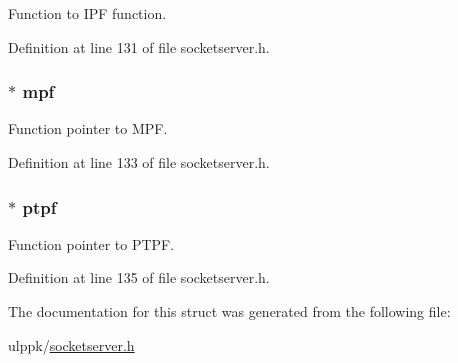 Function to I\-P\-F function. 



Definition at line 131 of file socketserver.\-h.

\hypertarget{struct_s_s_r_v_r___h_a_n_d_l_e_a2f352051a7414981c048ef9ac094a4f0}{
\subsubsection[{mpf}]{$\ast$ mpf}}\label{struct_s_s_r_v_r___h_a_n_d_l_e_a2f352051a7414981c048ef9ac094a4f0}


Function pointer to M\-P\-F. 



Definition at line 133 of file socketserver.\-h.

\hypertarget{struct_s_s_r_v_r___h_a_n_d_l_e_a13a63c2cf05342c600a759d3dfb237ee}{
\subsubsection[{ptpf}]{$\ast$ ptpf}}\label{struct_s_s_r_v_r___h_a_n_d_l_e_a13a63c2cf05342c600a759d3dfb237ee}


Function pointer to P\-T\-P\-F. 



Definition at line 135 of file socketserver.\-h.



The documentation for this struct was generated from the following file\-:\begin{DoxyCompactItemize}
\item 
ulppk/\hyperlink{socketserver_8h}{socketserver.\-h}\end{DoxyCompactItemize}
